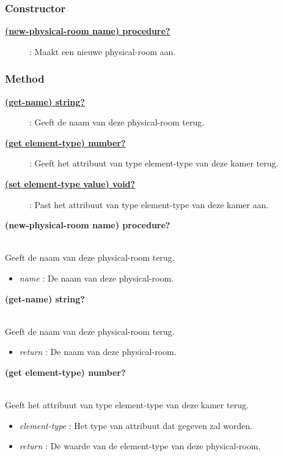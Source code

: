 \documentclass{article}
\newcommand{\ar}{\ding{213} }
\newcommand{\code}[1]{\textcolor{code}{#1}}
\newcommand{\lb}[1][]{\code{(#1}}
\newcommand{\rb}{\code{)}}
\newcommand{\racket}[1]{
	{\color{blue}\textbf{#1}}
}
\begin{document}
\subsubsection{Constructor}
\begin{description}
	\item[\hyperlink{physical-room:new-physical-room}{\racket{\lb[new-physical-room] name\rb \ar \code{procedure?}}}] : Maakt een nieuwe physical-room aan.
\end{description}

\subsubsection{Method}
\begin{description}
	\item[\hyperlink{physical-room:get-name}{\racket{\lb[get-name]\rb \ar \code{string?}}}] : Geeft de naam van deze physical-room terug.
	\item[\hyperlink{physical-room:get}{\racket{\lb[get] element-type\rb \ar \code{number?}}}] : Geeft het attribuut van type element-type van deze kamer terug.
	\item[\hyperlink{physical-room:set}{\racket{\lb[set] element-type value\rb \ar \code{void?}}}] : Past het attribuut van type element-type van deze kamer aan.
\end{description}

\begin{framed}
\hypertarget{physical-room:new-physical-room}{\racket{\lb[new-physical-room] name\rb \ar \code{procedure?}}}
\\Geeft de naam van deze physical-room terug.
\begin{itemize}
	\item \emph{name} : De naam van deze physical-room.
\end{itemize}
\end{framed}

\begin{framed}
\hypertarget{physical-room:get-name}{\racket{\lb[get-name]\rb \ar \code{string?}}}
\\Geeft de naam van deze physical-room terug.
	\begin{itemize}
		\item \emph{return} : De naam van deze physical-room.
	\end{itemize}
\end{framed}
	
\begin{framed}
	\hypertarget{physical-room:get}{\racket{\lb[get] element-type\rb \ar \code{number?}}}
	\\Geeft het attribuut van type element-type van deze kamer terug.
	\begin{itemize}
		\item \emph{element-type} : Het type van attribuut dat gegeven zal worden.
		\item \emph{return} : De waarde van de element-type van deze physical-room.
	\end{itemize}
\end{framed}
\end{document}
